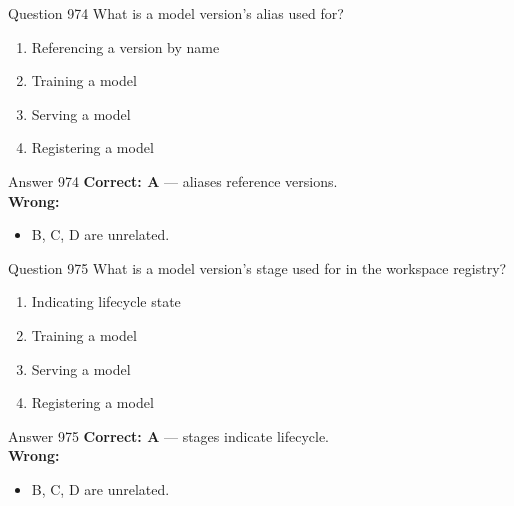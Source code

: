 \documentclass[aspectratio=169,11pt]{beamer}
\begin{document}
	\begin{frame}{Question 974}
		What is a model version's alias used for?
		\begin{enumerate}[label=\Alph*.]
			\item Referencing a version by name
			\item Training a model
			\item Serving a model
			\item Registering a model
		\end{enumerate}
	\end{frame}
	\begin{frame}{Answer 974}
		\textbf{Correct: A} --- aliases reference versions.\\
		\vspace{0.5em}
		\textbf{Wrong:}
		\begin{itemize}
			\item B, C, D are unrelated.
		\end{itemize}
	\end{frame}
	
	\begin{frame}{Question 975}
		What is a model version's stage used for in the workspace registry?
		\begin{enumerate}[label=\Alph*.]
			\item Indicating lifecycle state
			\item Training a model
			\item Serving a model
			\item Registering a model
		\end{enumerate}
	\end{frame}
	\begin{frame}{Answer 975}
		\textbf{Correct: A} --- stages indicate lifecycle.\\
		\vspace{0.5em}
		\textbf{Wrong:}
		\begin{itemize}
			\item B, C, D are unrelated.
		\end{itemize}
	\end{frame}
	
\end{document}
